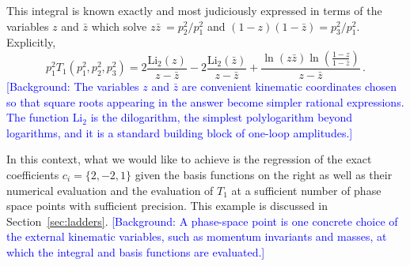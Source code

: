 \documentclass[a4paper,11pt]{article}
\newcommand{\zb}{\bar{z}}
\newcommand{\Li}{\text{Li}}
\begin{document}
This integral is known exactly and most judiciously expressed in terms of the variables  $z$ and $\zb$ which solve $z \zb \ = p_2^2/p_1^2$ and $(1-z)(1-\zb) = p_3^2/p_1^2$. Explicitly,
\begin{equation}
   p_{1}^{2}  T_1(p_1^2,p_2^2,p_3^2) =
 2\frac{\Li_2(z)}{z-\zb} -2\frac{\Li_2(\zb)}{z-\zb}+\frac{\ln (z \zb) \ln \left(\frac{1-z}{1-\zb}\right)}{z-\zb}\,.
 \label{eq:zform}
\end{equation} 
\textcolor{blue}{\small [Background: The variables $z$ and $\bar z$ are convenient kinematic coordinates chosen so that square roots appearing in the answer become simpler rational expressions. The function $\Li_2$ is the dilogarithm, the simplest polylogarithm beyond logarithms, and it is a standard building block of one-loop amplitudes.]}

In this context, what we would like to achieve is the regression of the exact coefficients $c_i = \{2,-2,1\}$  given the basis functions on the right as well as their numerical evaluation and the evaluation of $T_1$ at a sufficient number of phase space points with sufficient precision. This example is discussed in Section~\ref{sec:ladders}.
\textcolor{blue}{\small [Background: A phase-space point is one concrete choice of the external kinematic variables, such as momentum invariants and masses, at which the integral and basis functions are evaluated.]}
\end{document}
